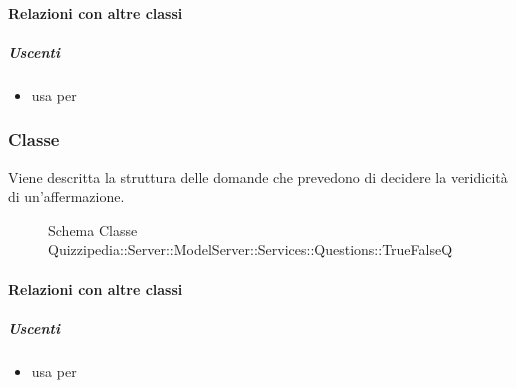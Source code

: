 \paragraph{Relazioni con altre classi}
\subparagraph{Uscenti}
\begin{itemize}
\item usa  per 
\end{itemize}
\subsubsection{Classe }
Viene descritta la struttura delle domande che prevedono di decidere la veridicità di un'affermazione.
\begin{figure}[H]
\centering
\noindent{}
\caption[Schema Classe TrueFalseQ]{Schema Classe Quizzipedia::Server::ModelServer::Services::Questions::TrueFalseQ}
\end{figure}
\paragraph{Relazioni con altre classi}
\subparagraph{Uscenti}
\begin{itemize}
\item usa  per 
\end{itemize}
